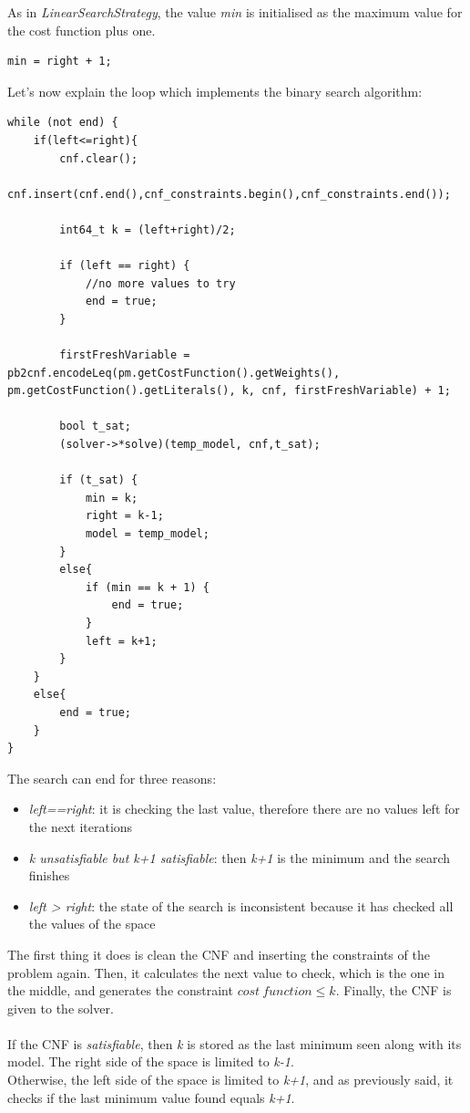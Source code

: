 As in \emph{LinearSearchStrategy}, the value \emph{min} is initialised as the maximum value for the cost function plus one.
\begin{verbatim}
min = right + 1;
\end{verbatim}
Let's now explain the loop which implements the binary search algorithm:
\begin{verbatim}
while (not end) {
    if(left<=right){
        cnf.clear();
        cnf.insert(cnf.end(),cnf_constraints.begin(),cnf_constraints.end());
    
        int64_t k = (left+right)/2;
    
        if (left == right) {
            //no more values to try
            end = true;
        }
    
        firstFreshVariable = pb2cnf.encodeLeq(pm.getCostFunction().getWeights(), pm.getCostFunction().getLiterals(), k, cnf, firstFreshVariable) + 1;
    
        bool t_sat;
        (solver->*solve)(temp_model, cnf,t_sat);
    
        if (t_sat) {
            min = k;
            right = k-1;
            model = temp_model;
        }
        else{
            if (min == k + 1) {
                end = true;
            }
            left = k+1;
        }
    }
    else{
        end = true;
    }
}
\end{verbatim}
The search can end for three reasons:
\begin{itemize}
	\item \emph{left==right}: it is checking the last value, therefore there are no values left for the next iterations
	\item \emph{k unsatisfiable but k+1 satisfiable}: then \emph{k+1} is the minimum and the search finishes
	\item \emph{left > right}: the state of the search is inconsistent because it has checked all the values of the space
\end{itemize}
The first thing it does is clean the CNF and inserting the constraints of the problem again. Then, it calculates the next value to check, which is the one in the middle, and generates the constraint $cost \ function \leq k$. Finally, the CNF is given to the solver.\\\\
If the CNF is \emph{satisfiable}, then \emph{k} is stored as the last minimum seen along with its model. The right side of the space is limited to \emph{k-1}.\\
Otherwise, the left side of the space is limited to \emph{k+1}, and as previously said, it checks if the last minimum value found equals \emph{k+1}.